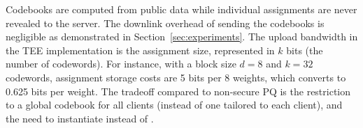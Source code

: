 


Codebooks are computed from public data while individual assignments are never revealed to the server. 
The downlink overhead of sending the codebooks is negligible as demonstrated in Section~\ref{sec:experiments}. 
The upload bandwidth in the TEE implementation is the assignment size, represented in $k$ bits (the number of codewords). 
For instance, with a block size $d=8$ and $k=32$ codewords, assignment storage costs are 5 bits per 8 weights, which converts to 0.625 bits per weight.
The tradeoff compared to non-secure PQ is the restriction to a global codebook for all clients (instead of one tailored to each client), and the need to instantiate \SecInd instead of \SecAgg. 
